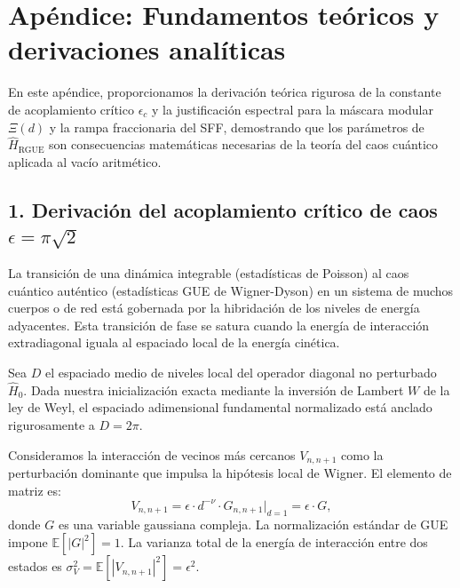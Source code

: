 \documentclass[aps,prl,preprint,superscriptaddress,floatfix]{revtex4-2}
\begin{document}
\appendix

\section{Apéndice: Fundamentos teóricos y derivaciones analíticas}
\label{app:theory}

En este apéndice, proporcionamos la derivación teórica rigurosa de la constante de acoplamiento crítico $\epsilon_c$ y la justificación espectral para la máscara modular $\Xi(d)$ y la rampa fraccionaria del SFF, demostrando que los parámetros de $\hat{H}_{\text{RGUE}}$ son consecuencias matemáticas necesarias de la teoría del caos cuántico aplicada al vacío aritmético.

\subsection{1. Derivación del acoplamiento crítico de caos \texorpdfstring{$\epsilon = \pi\sqrt{2}$}{epsilon}}
La transición de una dinámica integrable (estadísticas de Poisson) al caos cuántico auténtico (estadísticas GUE de Wigner-Dyson) en un sistema de muchos cuerpos o de red está gobernada por la hibridación de los niveles de energía adyacentes. Esta transición de fase se satura cuando la energía de interacción extradiagonal iguala al espaciado local de la energía cinética.

Sea $D$ el espaciado medio de niveles local del operador diagonal no perturbado $\hat{H}_0$. Dada nuestra inicialización exacta mediante la inversión de Lambert $W$ de la ley de Weyl, el espaciado adimensional fundamental normalizado está anclado rigurosamente a $D = 2\pi$.

Consideramos la interacción de vecinos más cercanos $V_{n, n+1}$ como la perturbación dominante que impulsa la hipótesis local de Wigner. El elemento de matriz es:
\begin{equation}
V_{n, n+1} = \epsilon \cdot d^{-\nu} \cdot G_{n, n+1} \bigg|_{d=1} = \epsilon \cdot G,
\end{equation}
donde $G$ es una variable gaussiana compleja. La normalización estándar de GUE impone $\mathbb{E}[|G|^2] = 1$. La varianza total de la energía de interacción entre dos estados es $\sigma_V^2 = \mathbb{E}[|V_{n, n+1}|^2] = \epsilon^2$.
\end{document}
